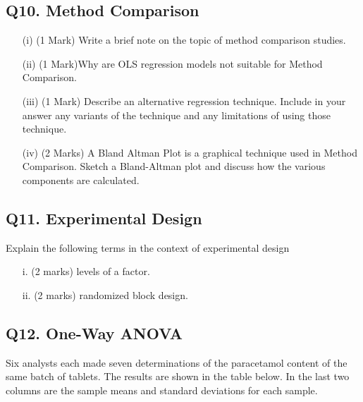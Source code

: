 \documentclass[a4paper,12pt]{article}
\begin{document}
\subsection*{Q10. Method Comparison}
\begin{itemize}
	\item[(i)] (1 Mark) Write a brief note on the topic of method comparison studies.
	\item[(ii)] (1 Mark)Why are OLS regression models not suitable for Method Comparison.
	\item[(iii)] (1 Mark) Describe an alternative regression technique. Include in your answer any variants of the technique and any limitations of using those technique.
	
	\item[(iv)] (2 Marks) A Bland Altman Plot is a graphical technique used in Method Comparison. Sketch a Bland-Altman plot and discuss how the various components are calculated.
\end{itemize}
\subsection*{Q11. Experimental Design }


Explain the following terms in the context of experimental design
	\begin{itemize}
		\item[i.] (2 marks) levels of a factor.
		\item[ii.] (2 marks) randomized block design.
	\end{itemize}
	
\subsection*{Q12. One-Way ANOVA } %
Six analysts each made seven determinations of the paracetamol content of the same batch of tablets.
The results are shown in the table below. In the last two columns are the sample means and standard deviations for each sample.\\
\bigskip
\end{document}
